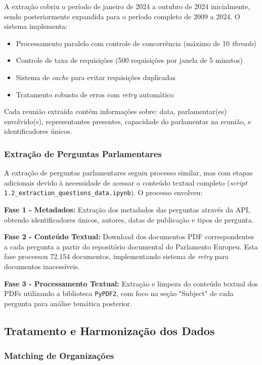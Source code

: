 A extração cobriu o período de janeiro de 2024 a outubro de 2024 inicialmente, sendo posteriormente expandida para o período completo de 2009 a 2024. O sistema implementa:
\begin{itemize}
    \item Processamento paralelo com controle de concorrência (máximo de 10 \textit{threads})
    \item Controle de taxa de requisições (500 requisições por janela de 5 minutos)
    \item Sistema de \textit{cache} para evitar requisições duplicadas
    \item Tratamento robusto de erros com \textit{retry} automático
\end{itemize}

Cada reunião extraída contém informações sobre: data, parlamentar(es) envolvido(s), representantes presentes, capacidade do parlamentar na reunião, e identificadores únicos.

\subsubsection{Extração de Perguntas Parlamentares}

A extração de perguntas parlamentares seguiu processo similar, mas com etapas adicionais devido à necessidade de acessar o conteúdo textual completo (\textit{script} \texttt{1.2\_extraction\_questions\_data.ipynb}). O processo envolveu:

\textbf{Fase 1 - Metadados:} Extração dos metadados das perguntas através da API, obtendo identificadores únicos, autores, datas de publicação e tipos de pergunta.

\textbf{Fase 2 - Conteúdo Textual:} Download dos documentos PDF correspondentes a cada pergunta a partir do repositório documental do Parlamento Europeu. Esta fase processou 72.154 documentos, implementando sistema de \textit{retry} para documentos inacessíveis.

\textbf{Fase 3 - Processamento Textual:} Extração e limpeza do conteúdo textual dos PDFs utilizando a biblioteca \texttt{PyPDF2}, com foco na seção "Subject" de cada pergunta para análise temática posterior.

\subsection{Tratamento e Harmonização dos Dados}

\subsubsection{Matching de Organizações}

